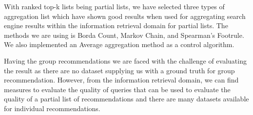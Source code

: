 With ranked top-k lists being partial lists, we have selected three types of aggregation list which have shown good results when used for aggregating search engine results within the information retrieval domain for partial lists. The methods we are using is Borda Count, Markov Chain, and Spearman's Footrule. We also implemented an Average aggregation method as a control algorithm.

Having the group recommendations we are faced with the challenge of evaluating the result as there are no dataset supplying us with a ground truth for group recommendation. However, from the information retrieval domain, we can find measures to evaluate the quality of queries that can be used to evaluate the quality of a partial list of recommendations and there are many datasets available for individual recommendations.







